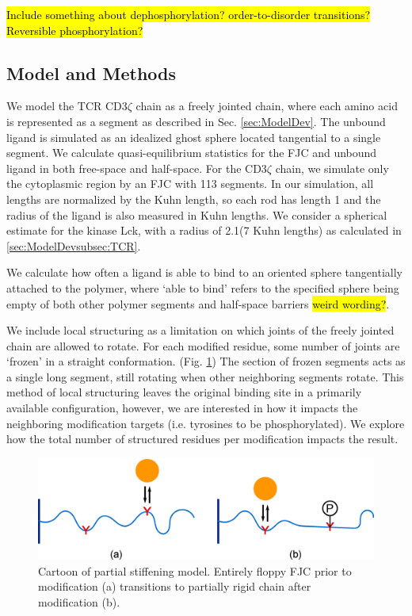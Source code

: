 \documentclass[../../AdvancementSummary.tex]{subfiles}
\begin{document}
\hl{Include something about dephosphorylation? order-to-disorder transitions? Reversible phosphorylation?}

\subsection{Model and Methods}

We model the TCR CD3$\zeta$ chain as a freely jointed chain, where each amino acid is represented as a segment as described in Sec. \ref{sec:ModelDev}. The unbound ligand is simulated as an idealized ghost sphere located tangential to a single segment. We calculate quasi-equilibrium statistics for the FJC and unbound ligand in both free-space and half-space. For the CD3$\zeta$ chain, we simulate only the cytoplasmic region by an FJC with 113 segments. In our simulation, all lengths are normalized by the Kuhn length, so each rod has length 1 and the radius of the ligand is also measured in Kuhn lengths. We consider a spherical estimate for the kinase Lck, with a radius of 2.1\nm (7 Kuhn lengths) as calculated in \ref{sec:ModelDevsubsec:TCR}.

We calculate how often a ligand is able to bind to an oriented sphere tangentially attached to the polymer, where `able to bind' refers to the specified sphere being empty of both other polymer segments and half-space barriers \hl{weird wording?}. 

We include local structuring as a limitation on which joints of the freely jointed chain are allowed to rotate. For each modified residue, some number of joints are `frozen' in a straight conformation. (Fig. \ref{fig: StiffeningCartoon}) The section of frozen segments acts as a single long segment, still rotating when other neighboring segments rotate. This method of local structuring leaves the original binding site in a primarily available configuration, however, we are interested in how it impacts the neighboring modification targets (i.e. tyrosines to be phosphorylated). We explore how the total number of structured residues per modification impacts the result. 

\begin{figure}[H]
\begin{center}
    \includegraphics[width=0.8\linewidth]{ResultsFigures/StiffeningDiagram/StiffeningDiagram.eps}
    \caption{Cartoon of partial stiffening model. Entirely floppy FJC prior to modification (a) transitions to partially rigid chain after modification (b). \label{fig: StiffeningCartoon}}
    \end{center}
\end{figure}
\end{document}
